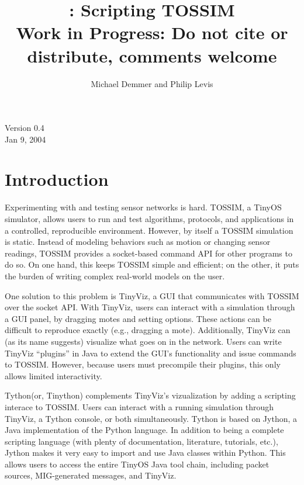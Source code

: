 \documentclass[10pt]{article}
\title{\name: Scripting TOSSIM\\{\small \bf Work in Progress: Do not cite or distribute, comments welcome}}
\author{Michael Demmer and Philip Levis}
\date{}
\newcommand{\name}{{Tython}\xspace}
\begin{document}
\maketitle
\vspace{2in}
\begin{center}
Version 0.4\\
Jan 9, 2004
\end{center}

\fontsize{10}{10}                               %


\thispagestyle{empty}
\newpage
\tableofcontents
\newpage

\section{Introduction}

Experimenting with and testing sensor networks is hard. TOSSIM, a
TinyOS simulator, allows users to run and test algorithms, protocols,
and applications in a controlled, reproducible environment. However,
by itself a TOSSIM simulation is static. Instead of modeling behaviors
such as motion or changing sensor readings, TOSSIM provides a
socket-based command API for other programs to do so. On one hand, this
keeps TOSSIM simple and efficient; on the other, it puts the burden
of writing complex real-world models on the user.

One solution to this problem is TinyViz, a GUI that communicates with
TOSSIM over the socket API. With TinyViz, users can interact with a
simulation through a GUI panel, by dragging motes and setting options.
These actions can be difficult to reproduce exactly (e.g., dragging a
mote). Additionally, TinyViz can (as its name suggests) visualize what
goes on in the network. Users can write TinyViz ``plugins'' in Java to
extend the GUI's functionality and issue commands to TOSSIM. However,
because users must precompile their plugins, this only allows limited
interactivity.

\name (or, Tinython) complements TinyViz's vizualization by adding a
scripting interace to TOSSIM. Users can interact with a running
simulation through TinyViz, a \name console, or both simultaneously.
\name is based on Jython, a Java implementation of the Python
language. In addition to being a complete scripting language (with
plenty of documentation, literature, tutorials, etc.), Jython makes it
very easy to import and use Java classes within Python. This allows
users to access the entire TinyOS Java tool chain, including packet
sources, MIG-generated messages, and TinyViz.
\end{document}
